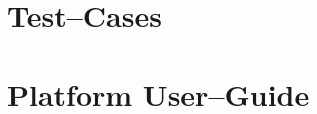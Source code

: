 \chapter{Test--Cases} \label{chp:test-cases}
	
	
\chapter{Platform User--Guide} \label{chp:platform-user-guide}
	
	
	
